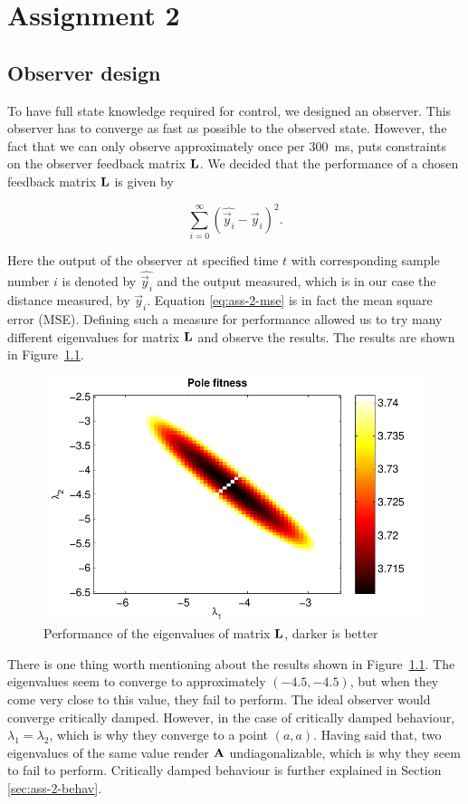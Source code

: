 \documentclass[11pt,titlepage]{report}
\begin{document}
\chapter{Assignment 2}
\section{Observer design}
To have full state knowledge required for control, we designed an observer. This observer has to converge as fast as possible to the observed state. However, the fact that we can only observe approximately once per \SI{300}{ms}, puts constraints on the observer feedback matrix $\mathbf{L}$. We decided that the performance of a chosen feedback matrix $\mathbf{L}$ is given by

\begin{equation} \label{eq:ass-2-mse}
	\sum_{i=0}^{\infty} (\hat{\vec{y}_i}-\vec{y}_i)^2.
\end{equation}

Here the output of the observer at specified time $t$ with corresponding sample number $i$ is denoted by $\hat{\vec{y}_i}$ and the output measured, which is in our case the distance measured, by $\vec{y}_i$. Equation \ref{eq:ass-2-mse} is in fact the mean square error (MSE). Defining such a measure for performance allowed us to try many different eigenvalues for matrix $\mathbf{L}$ and observe the results. The results are shown in Figure~\ref{fig:ass-2-eigs}.

\begin{figure}[H]
	\begin{center}
		\includegraphics[width=.7\linewidth]{resource/pole-fitness.pdf}
	\end{center}
	\caption{Performance of the eigenvalues of matrix $\mathbf{L}$, darker is better}
	\label{fig:ass-2-eigs}
\end{figure}

There is one thing worth mentioning about the results shown in Figure~\ref{fig:ass-2-eigs}. The eigenvalues seem to converge to approximately $(-4.5,-4.5)$, but when they come very close to this value, they fail to perform. The ideal observer would converge critically damped. However, in the case of critically damped behaviour, $\lambda_1 = \lambda_2$, which is why they converge to a point $(a,a)$. Having said that, two eigenvalues of the same value render $\mathbf{A}$ undiagonalizable, which is why they seem to fail to perform. Critically damped behaviour is further explained in Section \ref{sec:ass-2-behav}.
\end{document}
